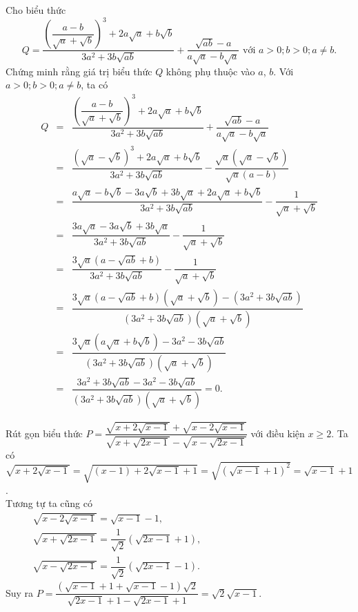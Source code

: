 \begin{bt}%
	Cho biểu thức
	$$Q = \dfrac{\left( \dfrac{a - b}{\sqrt{a} + \sqrt{b}} \right)^3 + 2a \sqrt{a} + b \sqrt{b}}{3a^2 + 3b \sqrt{ab}} + \dfrac{\sqrt{ab} - a}{a \sqrt{a} - b \sqrt{a}}  \text{ với } a > 0; b > 0; a \neq b.$$
	Chứng minh rằng giá trị biểu thức $Q$ không phụ thuộc vào $a$, $b$.
	\loigiai
	{
		Với $a > 0; b > 0; a \neq b$, ta có
		\allowdisplaybreaks
		\begin{eqnarray*}
			Q &=& \dfrac{\left( \dfrac{a - b}{\sqrt{a} + \sqrt{b}} \right)^3 + 2a \sqrt{a} + b \sqrt{b}}{3a^2 + 3b \sqrt{ab}} + \dfrac{\sqrt{ab} - a}{a \sqrt{a} - b \sqrt{a}}\\
			&=& \dfrac{\left( \sqrt{a} - \sqrt{b} \right)^3 + 2a \sqrt{a} + b \sqrt{b}}{3a^2 + 3b \sqrt{ab}} - \dfrac{\sqrt{a} \left( \sqrt{a} - \sqrt{b} \right)}{\sqrt{a} (a - b)}\\
			&=& \dfrac{a \sqrt{a} - b \sqrt{b} - 3a \sqrt{b} + 3b \sqrt{a} + 2a \sqrt{a} + b \sqrt{b}}{3a^2 + 3b \sqrt{ab}} - \dfrac{1}{\sqrt{a} + \sqrt{b}}\\
			&=& \dfrac{3a \sqrt{a} - 3a \sqrt{b} + 3b \sqrt{a}}{3a^2 + 3b \sqrt{ab}} - \dfrac{1}{\sqrt{a} + \sqrt{b}}\\
			&=& \dfrac{3 \sqrt{a} \left( a - \sqrt{ab} + b \right)}{3a^2 + 3b \sqrt{ab}} - \dfrac{1}{\sqrt{a} + \sqrt{b}}\\
			&=& \dfrac{3 \sqrt{a} \left( a - \sqrt{ab} + b \right) \left( \sqrt{a} + \sqrt{b} \right) - \left( 3a^2 + 3b \sqrt{ab} \right)}{\left( 3a^2 + 3b \sqrt{ab} \right) \left( \sqrt{a} + \sqrt{b} \right)} \\
			&=& \dfrac{3 \sqrt{a} \left( a \sqrt{a} + b \sqrt{b} \right) - 3a^2 - 3b \sqrt{ab}}{\left( 3a^2 + 3b \sqrt{ab} \right) \left( \sqrt{a} + \sqrt{b} \right)}\\
			&=& \dfrac{3a^2 + 3b \sqrt{ab} - 3a^2 - 3b \sqrt{ab}}{\left( 3a^2 + 3b \sqrt{ab} \right) \left( \sqrt{a} + \sqrt{b} \right)} = 0.
		\end{eqnarray*}
	}
\end{bt}

\begin{bt}%
	Rút gọn biểu thức $P=\dfrac{\sqrt{x+2\sqrt{x-1}}+\sqrt{x-2\sqrt{x-1}}}{\sqrt{x+\sqrt{2x-1}}-\sqrt{x-\sqrt{2x-1}}}$ với điều kiện $x\geq 2$.
	\loigiai
	{
		Ta có $\sqrt{x+2\sqrt{x-1}}=\sqrt{(x-1)+2\sqrt{x-1}+1}=\sqrt{\left(\sqrt{x-1}+1\right)^2}=\sqrt{x-1}+1$.\\
		Tương tự ta cũng có\\
		\allowdisplaybreaks
		$\begin{aligned}
		& &&\sqrt{x-2\sqrt{x-1}}=\sqrt{x-1}-1,\\
		& &&\sqrt{x+\sqrt{2x-1}}=\dfrac{1}{\sqrt{2}}\left(\sqrt{2x-1}+1\right),\\
		& &&\sqrt{x-\sqrt{2x-1}}=\dfrac{1}{\sqrt{2}}\left(\sqrt{2x-1}-1\right).
		\end{aligned}$
		\\
		Suy ra $P=\dfrac{\left(\sqrt{x-1}+1+\sqrt{x-1}-1\right)\sqrt{2}}{\sqrt{2x-1}+1-\sqrt{2x-1}+1}=\sqrt{2}\sqrt{x-1}$.
	}
\end{bt}

